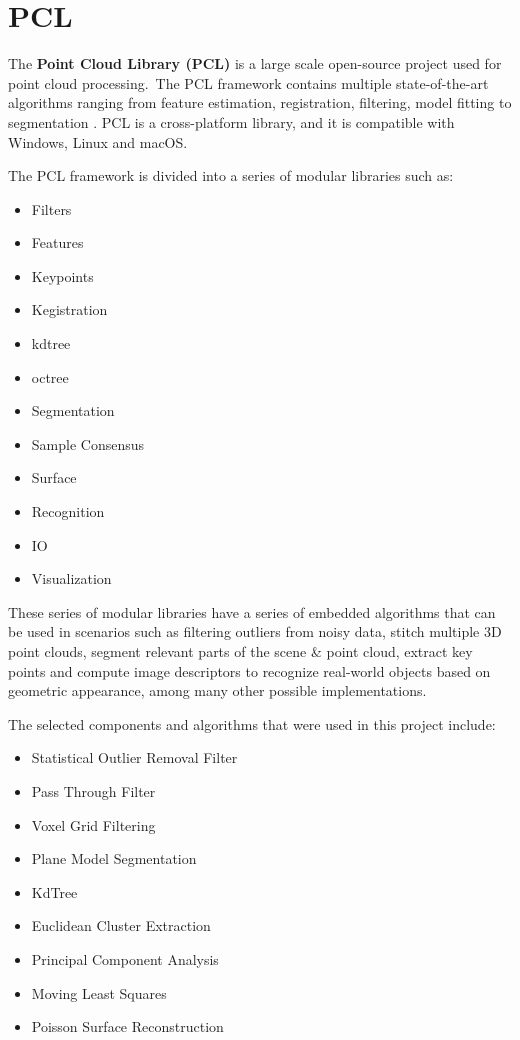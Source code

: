 \documentclass[12pt]{report}
\begin{document}
    \section{PCL}
    \label{section:pcl}
    The \textbf{Point Cloud Library (PCL)} is a large scale open-source project used for point cloud processing.\
    The PCL framework contains multiple state-of-the-art algorithms ranging from feature estimation, registration, filtering, model fitting to segmentation . 
    PCL is a cross-platform library, and it is compatible with Windows, Linux and macOS.
    
    The PCL framework is divided into a series of modular libraries such as:
    \begin{multicols}{2}
    \begin{itemize}
      \itemsep0em 
      \item Filters
      \item Features
      \item Keypoints
      \item Kegistration
      \item kdtree
      \item octree
      \item Segmentation
      \item Sample Consensus
      \item Surface
      \item Recognition
      \item IO 
      \item Visualization
    \end{itemize}
    \end{multicols}
    
    These series of modular libraries  have a series of embedded algorithms  that can be used in scenarios such as filtering outliers from noisy data, stitch multiple 3D point clouds,
    segment relevant parts of the scene \& point cloud, extract key points and compute image descriptors to recognize real-world objects based on geometric appearance, among many other possible implementations.
    
    The selected components and algorithms that were used in this project include: 
    
    \begin{itemize}
      \itemsep0em 
      \item Statistical Outlier Removal Filter
      \item Pass Through Filter
      \item Voxel Grid Filtering
      \item Plane Model Segmentation
      \item KdTree
      \item Euclidean Cluster Extraction
      \item Principal Component Analysis
      \item Moving Least Squares
      \item Poisson Surface Reconstruction 
    \end{itemize}
    
\end{document}
